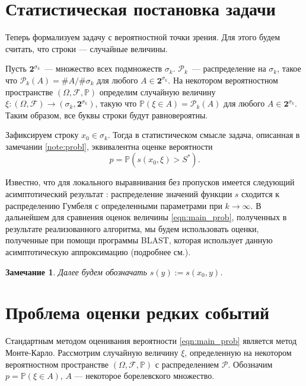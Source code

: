 \documentclass{spisok-article}
\newtheorem{note}{Замечание}
\begin{document}
\section{Статистическая постановка задачи}
Теперь формализуем задачу с вероятностной точки зрения. Для этого будем считать, что строки --- случайные величины.

Пусть $\mathbf{2}^{\sigma_k}$~--- множество всех подмножеств $\sigma_k$.
$\mathcal{P}_k$~--- распределение на $\sigma_k$, такое что $\mathcal{P}_k(A) = \#A/\#\sigma_k$ для любого $A \in \mathbf{2}^{\sigma_k}$.
На некотором вероятностном пространстве $(\Omega, \mathcal{F}, \mathbb{P})$ определим случайную величину $\xi:(\Omega, \mathcal{F}) \longrightarrow (\sigma_k, \mathbf{2}^{\sigma_k})$, такую что $\mathbb{P}(\xi \in A) = \mathcal{P}_k(A)$ для любого $A \in \mathbf{2}^{\sigma_k}$. Таким образом, все буквы строки будут равновероятны.

Зафиксируем строку $x_0 \in \sigma_k$. Тогда в статистическом смысле задача, описанная в замечании \ref{note:probl}, эквивалентна оценке вероятности 
\begin{equation}
p = \mathbb{P}(s(x_0, \xi) > S^*).
\label{eqn:main_prob}
\end{equation}

Известно, что для локального выравнивания без пропусков имеется следующий асимптотический результат \cite{BLAST}: распределение значений функции $s$ сходится к распределению Гумбеля с определенными параметрами при $k  \to \infty$. В дальнейшем для сравнения оценок величины \eqref{eqn:main_prob}, полученных в результате реализованного алгоритма, мы будем использовать оценки, полученные при помощи программы BLAST, которая использует данную асимптотическую аппроксимацию (подробнее см.\cite{BLAST}).  

\begin{note}
\label{note:score}
Далее будем обозначать $s(y) := s(x_0, y)$.
\end{note}

\section{Проблема оценки редких событий} 
Стандартным методом оценивания вероятности \eqref{eqn:main_prob} является метод Монте-Карло.
Рассмотрим случайную величину $\xi$, определенную на некотором вероятностном пространстве $(\Omega, \mathcal{F}, \mathbb{P})$ с распределением $\mathcal{P}$. Обозначим $p = \mathbb{P}(\xi \in A)$, $A$ --- некоторое борелевского множество. 
\end{document}
